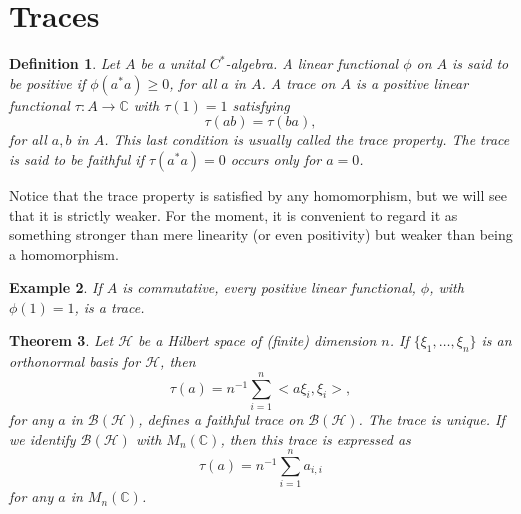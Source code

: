 \documentclass{book}
\newtheorem{definition}{Definition}[section]
\newtheorem{example}[definition]{Example}
\newtheorem{theorem}[definition]{Theorem}
\def\cstar{\(C^*\)-algebra}
\begin{document}
\section{Traces}
\begin{definition}
  Let \(A\) be a unital \cstar. A linear functional \(\phi\) on
  \(A\) is said to be positive if \(\phi(a^*a) \geq 0\), for all \(a\) in \(A\). A trace on \(A\) is a
  positive linear functional \(\tau : A \rightarrow \mathbb{C}\) with \(\tau(1) = 1\) satisfying
  \[\tau(ab) = \tau(ba),\]
  for all \(a,b\) in \(A\). This last condition is usually called the trace property. The
  trace is said to be faithful if \(\tau(a^*a) = 0\) occurs only for \(a = 0\).
\end{definition}
Notice that the trace property is satisfied by any homomorphism, but we
will see that it is strictly weaker. For the moment, it is convenient to regard
it as something stronger than mere linearity (or even positivity) but weaker
than being a homomorphism.
\begin{example}
  If \(A\) is commutative, every positive linear functional, \(\phi\),
  with \(\phi(1) = 1\), is a trace.
\end{example}
\begin{theorem}\label{theorem:1103}
  Let \(\mathcal{H}\) be a Hilbert space of (finite) dimension \(n\). If
  \(\{\xi_1,\ldots,\xi_n\}\) is an orthonormal basis for \(\mathcal{H}\), then
  \[
  \tau(a) =n^{-1}\sum^n_{i=1}<a\xi_i,\xi_i >,
  \]
  for any \(a\) in \(\mathcal{B}(\mathcal{H})\), defines a faithful trace on \(\mathcal{B}(\mathcal{H})\). The trace is unique. If
  we identify \(\mathcal{B}(\mathcal{H})\) with \(M_n(\mathbb{C})\), then this trace is expressed as
  \[
  \tau(a) =n^{-1}\sum_{i=1}^n a_{i,i}
  \]
  for any \(a\) in \(M_n(\mathbb{C})\).
\end{theorem}
\end{document}
